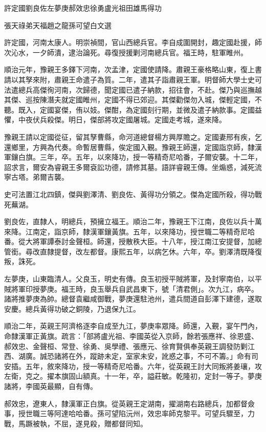 
\begin{pinyinscope}
許定國劉良佐左夢庚郝效忠徐勇盧光祖田雄馬得功

張天祿弟天福趙之龍孫可望白文選

許定國，河南太康人。明崇禎間，官山西總兵官。李自成圍開封，趣定國赴援，師次沁水，一夕師潰，逮治論死。尋復授援剿河南總兵官。福王時，駐軍睢州。

順治元年，豫親王多鐸下河南，次孟津，定國使請降。肅親王豪格略山東，復上書請以其孥來附，肅親王命遣子為質。二年，遣其子詣肅親王軍。明督師大學士史可法遣總兵高傑徇河南，次歸德，聞定國已遣子納款，招往會，不赴。傑乃與巡撫越其傑、巡按陳潛夫就定國睢州，定國不得已郊迎。其傑勸傑勿入城，傑輕定國，不聽。既入，定國宴傑，侑以妓。傑酣，為定國刻行期，並微及遣子納款事。定國益懼，中夜伏兵殺傑。明日，傑部將攻定國屠城。定國走考城，遂來降。

豫親王請以定國從征，留其孥曹縣，命河道總督楊方興厚贍之。定國妻邢有疾，乞還鄉里，方興為代奏。命暫居曹縣，俟定國入覲。豫親王師還，定國詣京師，隸漢軍鑲白旗。三年，卒。五年，以來降功，授一等精奇尼哈番，子爾安襲。十二年，詔求言，爾安為睿親王多爾袞訟功德，請修其墓。語詳睿親王傳。坐煽惑，減死流寧古塔。弟爾吉襲。

史可法置江北四鎮，傑與劉澤清、劉良佐、黃得功分領之。傑為定國所殺，得功戰死蕪湖。

劉良佐，直隸人，明總兵，預擁立福王。順治二年，豫親王下江南，良佐以兵十萬來降。江南定，詣京師，隸漢軍鑲黃旗。五年，以來降功，授世職二等精奇尼哈番。從大將軍譚泰討金聲桓。師還，授散秩大臣。十八年，授江南江安提督，加總管銜。尋改直隸提督，改左都督。康熙五年，以病乞休。六年，卒。劉澤清既降復叛，誅死。

左夢庚，山東臨清人。父良玉，明史有傳。良玉初授平賊將軍，及封寧南伯，以平賊將軍印授夢庚。福王時，良玉舉兵自武昌東下，號「清君側」。次九江，病卒。諸將推夢庚為帥。總督袁繼咸御戰，夢庚還駐池州，遣兵間道自彭澤下建德，遂取安慶。總兵黃得功破之銅陵，乃退保九江。

順治二年，英親王阿濟格逐李自成至九江，夢庚率眾降。師還，入覲，宴午門內，命隸漢軍正黃旗。疏言：「部將盧光祖、李國英從入京師，餘若張應祥、徐恩盛、郝效忠、金聲桓、常登、徐勇、吳學禮、張應元、徐育賢俱奉英親王調發防剿江西、湖廣。誠恐諸將在外，蹤跡未定，室家未安，訛惑之事，不可不籌。」命有司安插。五年，敘來降功，授一等精奇尼哈番。六年，從英親王討大同叛將姜瓖，攻左衛，克之。擢本旗固山額真。十一年，卒，謚莊敏。乾隆初，定封一等子。夢庚諸將，李國英最顯，自有傳。

郝效忠，遼東人，隸漢軍正白旗。從英親王定湖南，擢湖南右路總兵，加都督僉事，授世職三等阿達哈哈番。孫可望陷沅州，效忠率師克黎平。可望兵驟至，力戰，馬蹶被執，不屈，遂見殺，贈都督同知。


\end{pinyinscope}
